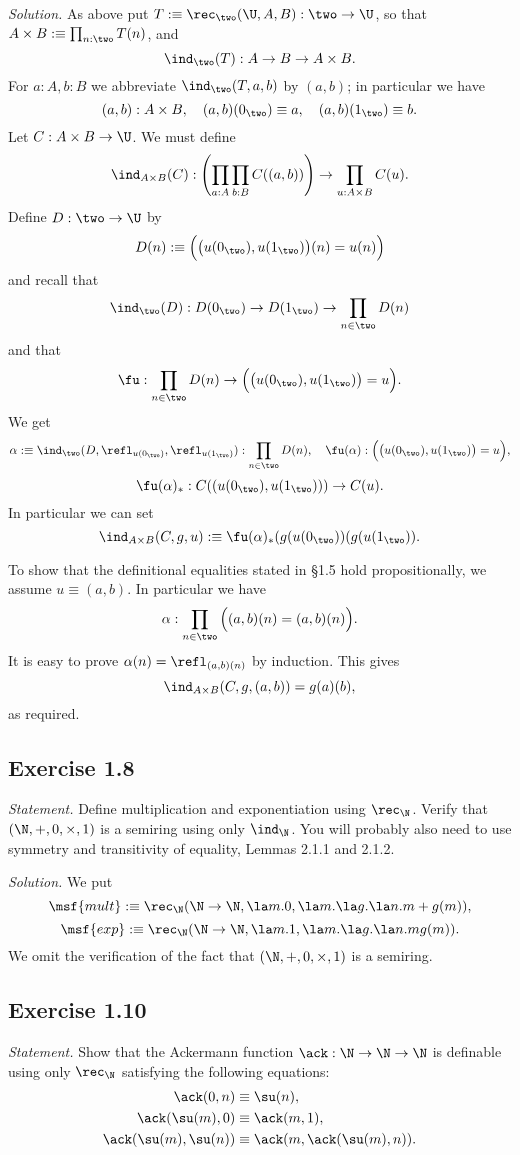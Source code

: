 \documentclass[12pt]{article}
\begin{document}
\nn\emph{Solution.} As above put $T:\equiv\rec_\two(\U,A,B):\two\to\U$, so that $A\times B:\equiv\prod_{n:\two}T(n)$, and 
$$
\ind_\two(T):A\to B\to A\times B.
$$ 
For $a:A,b:B$ we abbreviate $\ind_\two(T,a,b)$ by $(a,b)$; in particular we have 
$$
(a,b):A\times B,\quad(a,b)(0_\two)\equiv a,\quad(a,b)(1_\two)\equiv b.
$$ 
Let $C:A\times B\to\U$. We must define 
$$
\ind_{A\times B}(C):\left(\prod_{a:A}\prod_{b:B}C((a,b))\right)\to\prod_{u:A\times B}C(u).
$$ 
Define $D:\two\to\U$ by 
$$
D(n):\equiv\Big(\big(u(0_\two),u(1_\two)\big)(n)=u(n)\Big)
$$ 
and recall that 
$$
\ind_\two(D):D(0_\two)\to D(1_\two)\to\prod_{n\in\two}D(n)
$$ 
and that 
$$
\fu:\prod_{n\in\two}D(n)\to\Big(\big(u(0_\two),u(1_\two)\big)=u\Big).
$$
We get 
$$
\alpha:\equiv\ind_\two(D,\refl_{u(0_\two)},\refl_{u(1_\two)}):\prod_{n\in\two}D(n),\quad\fu(\alpha):\Big(\big(u(0_\two),u(1_\two)\big)=u\Big),
$$
$$
\fu(\alpha)_*:C((u(0_\two),u(1_\two)))\to C(u).
$$
In particular we can set
$$
\ind_{A\times B}(C,g,u):\equiv\fu(\alpha)_*(g(u(0_\two))(g(u(1_\two)).
$$

To show that the definitional equalities stated in \S1.5 hold propositionally, we assume $u\equiv(a,b)$. In particular we have 
$$
\alpha:\prod_{n\in\two}\Big((a,b)(n)=(a,b)(n)\Big).
$$ 
It is easy to prove $\alpha(n)=\refl_{(a,b)(n)}$ by induction. This gives 
$$
\ind_{A\times B}(C,g,(a,b))=g(a)(b),
$$ 
as required.


\subsection{Exercise 1.8}

\emph{Statement.} Define multiplication and exponentiation using $\rec_\N$. Verify that $(\N,+,0,\times,1)$ is a semiring using only $\ind_\N$. You will probably also need to use symmetry and transitivity of equality, Lemmas 2.1.1 and 2.1.2.

\nn\emph{Solution.} We put
$$
\msf{mult}:\equiv\rec_\N(\N\to\N,\la m.0,\la m.\la g.\la n.m+g(m)),
$$
$$
\msf{exp}:\equiv\rec_\N(\N\to\N,\la m.1,\la m.\la g.\la n.mg(m)).
$$ 
We omit the verification of the fact that $(\N,+,0,\times,1)$ is a semiring.


\subsection{Exercise 1.10}

\emph{Statement.} Show that the Ackermann function $\ack :\N\to\N\to\N$ is definable using only $\rec_\N$ satisfying the following equations:
\begin{align*}
\ack(0,n)&\equiv\su(n),\\
\ack(\su(m),0)&\equiv\ack(m,1),\\
\ack(\su(m),\su(n))&\equiv\ack(m,\ack(\su(m),n)).
\end{align*}
\end{document}
